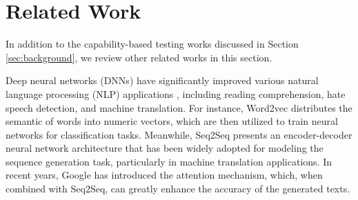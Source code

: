 \section{Related Work}


In addition to the capability-based testing works discussed in Section \ref{sec:background}, we review other related works in this section.











 Deep neural networks (DNNs) have significantly improved various natural language processing (NLP) applications \cite{mikolov2013efficient, sutskever2014sequence, vaswani2017attention, devlin2018bert, radford2018improving, gehring2017convolutional, pennington2014glove, joulin2016bag, schuster1997bidirectional, chen2022nicgslowdown}, including reading comprehension, hate speech detection, and machine translation.
For instance, Word2vec \cite{mikolov2013efficient} distributes the semantic of words into numeric vectors, which are then utilized to train neural networks for classification tasks. 
Meanwhile, Seq2Seq \cite{sutskever2014sequence} presents an encoder-decoder neural network architecture that has been widely adopted for modeling the sequence generation task, particularly in machine translation applications.
In recent years, Google \cite{vaswani2017attention} has introduced the attention mechanism, which, when combined with Seq2Seq, can greatly enhance the accuracy of the generated texts.


